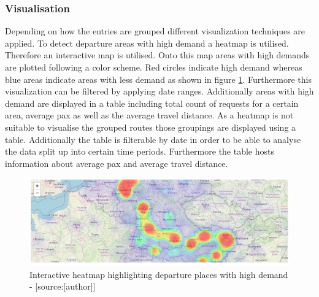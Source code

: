 \subsubsection{Visualisation}
Depending on how the entries are grouped different visualization techniques are applied. To detect departure areas with high demand a heatmap is utilised. Therefore an interactive map is utilised. Onto this map areas with high demands are plotted following a color scheme. Red circles indicate high demand whereas blue areas indicate areas with less demand as shown in figure \ref{fig:heatmap_dep}. Furthermore this visualization can be filtered by applying date ranges. Additionally areas with high demand are displayed in a table including total count of requests for a certain area, average pax as well as the average travel distance.
\newline
As a heatmap is not suitable to visualise the grouped routes those groupings are displayed using a table. Additionally the table is filterable by date in order to be able to analyse the data split up into certain time periods. Furthermore the table hosts information about average pax and average travel distance. 
\begin{figure}[H]
	\centering
		\includegraphics[width=15cm]{images/heatmap_dep}
	\caption{Interactive heatmap highlighting departure places with high demand - [source:[author]]}
	\label{fig:heatmap_dep}
\end{figure}


